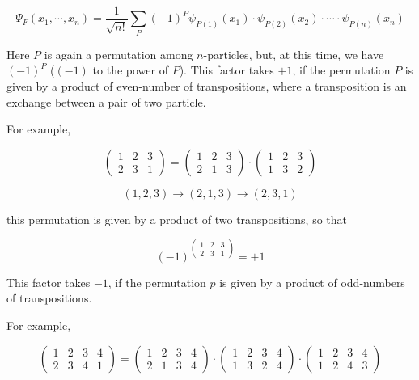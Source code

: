 \[\Psi_F(x_1,\cdots,x_n) = \frac{1}{\sqrt{n!}}\sum_P(-1)^P\psi_{P(1)}(x_1)\cdot\psi_{P(2)}(x_2)\cdot\cdots\cdot\psi_{P(n)}(x_n) \]

Here $P$ is again a permutation among $n$-particles, but, at this time, we have $(-1)^P$ ($(-1)$ to the power of $P$). This factor takes $+1$, if the permutation $P$ is given by a product of even-number of transpositions, where a transposition is an exchange between a pair of two particle. 

For example, 

\[
\left(\begin{matrix}
1 & 2 & 3\\ 2 & 3 & 1
\end{matrix}\right) = 
\left(\begin{matrix}
1 & 2 & 3\\ 2 & 1 & 3
\end{matrix}\right)
\cdot
\left(\begin{matrix}
1 & 2 & 3\\ 1 & 3 & 2
\end{matrix}\right)
\]

\[(1,2,3)\rightarrow(2,1,3)\rightarrow(2,3,1) \]

this permutation is given by a product of two transpositions, so that

\[(-1)^{\left(\begin{matrix}
1 & 2 & 3\\ 2 & 3 & 1
\end{matrix}\right)} = +1 \]

This factor takes $-1$, if the permutation $p$ is given by a product of odd-numbers of transpositions. 

For example, 

\[
\left(\begin{matrix}
1 & 2 & 3 & 4\\ 2 & 3 & 4 & 1
\end{matrix}\right)=
\left(\begin{matrix}
1 & 2 & 3 & 4\\ 2 & 1 & 3 & 4
\end{matrix}\right)
\cdot
\left(\begin{matrix}
1 & 2 & 3 & 4\\ 1 & 3 & 2 & 4
\end{matrix}\right)
\cdot
\left(\begin{matrix}
1 & 2 & 3 & 4\\ 1 & 2 & 4 & 3
\end{matrix}\right)
\]

